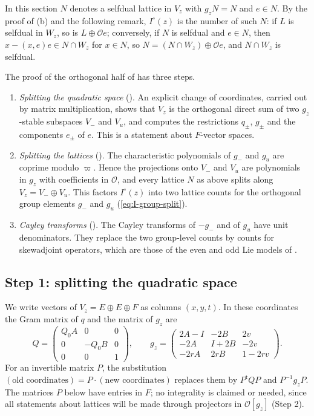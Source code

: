 \documentclass[11pt,oneside,notitlepage]{book}
\numberwithin{equation}{section}
\theoremstyle{plain}
\theoremstyle{definition}
\newcommand{\cO}{\mathcal{O}}
\begin{document}
In this section $N$ denotes a selfdual lattice in $V_z$ with $g_zN=N$ and $e\in N$. By the proof of (b) and the following remark, $I^\circ(z)$ is the number of such $N$: if $L$ is selfdual in $W_z$, so is $L\oplus\cO e$; conversely, if $N$ is selfdual and $e\in N$, then $x-(x,e)e\in N\cap W_z$ for $x\in N$, so $N=(N\cap W_z)\oplus\cO e$, and $N\cap W_z$ is selfdual.

The proof of the orthogonal half of  has three steps.
\begin{enumerate}[label=(\arabic*)]
\item \emph{Splitting the quadratic space} (). An explicit change of coordinates, carried out by matrix multiplication, shows that $V_z$ is the orthogonal direct sum of two $g_z$-stable subspaces $V_-$ and $V_u$, and computes the restrictions $q_\pm$, $g_\pm$ and the components $e_\pm$ of $e$. This is a statement about $F$-vector spaces.
\item \emph{Splitting the lattices} (). The characteristic polynomials of $g_-$ and $g_u$ are coprime modulo $\varpi$. Hence the projections onto $V_-$ and $V_u$ are polynomials in $g_z$ with coefficients in $\cO$, and every lattice $N$ as above splits along $V_z=V_-\oplus V_u$. This factors $I^\circ(z)$ into two lattice counts for the orthogonal group elements $g_-$ and $g_u$ (\eqref{eq:I-group-split}).
\item \emph{Cayley transforms} (). The Cayley transforms of $-g_-$ and of $g_u$ have unit denominators. They replace the two group-level counts by counts for skewadjoint operators, which are those of the even and odd Lie models of .
\end{enumerate}

\subsection*{Step 1: splitting the quadratic space}

We write vectors of $V_z=E\oplus E\oplus F$ as columns $(x,y,t)$. In these coordinates the Gram matrix of $q$ and the matrix of $g_z$ are
\[
Q=\begin{pmatrix}Q_0A&0&0\\0&-Q_0B&0\\0&0&1\end{pmatrix},\qquad
g_z=\begin{pmatrix}2A-I&-2B&2v\\-2A&I+2B&-2v\\-2rA&2rB&1-2rv\end{pmatrix}.
\]
For an invertible matrix $P$, the substitution $(\text{old coordinates})=P\cdot(\text{new coordinates})$ replaces them by $P^{\mathsf t}QP$ and $P^{-1}g_zP$. The matrices $P$ below have entries in $F$; no integrality is claimed or needed, since all statements about lattices will be made through projectors in $\cO[g_z]$ (Step 2).
\end{document}
